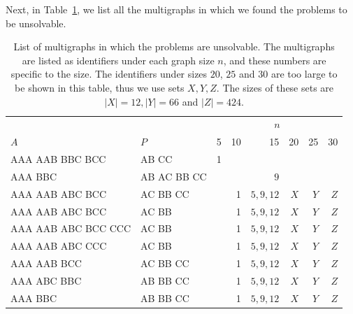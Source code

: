 Next, in Table~\ref{tbl:results:asd3}, we list all the multigraphs in which we found the problems to be unsolvable.

\begin{table}[H]
    \centering
    \begin{tabular}{ll|r|r|r|r|r|r}
        \toprule
        && \multicolumn{6}{c}{$n$} \\
        \cmidrule{3-8}
        $A$ & $P$ & 5&10&15&20&25&30\\
        \midrule
        AAA AAB BBC BCC     & AB CC       & 1 &   &          &     &     &    \\
        AAA BBC             & AB AC BB CC &   &   & $9$      &     &     &    \\
        AAA AAB ABC BCC     & AC BB CC    &   & 1 & $5,9,12$ & $X$ & $Y$ & $Z$\\
        AAA AAB ABC BCC     & AC BB       &   & 1 & $5,9,12$ & $X$ & $Y$ & $Z$\\
        AAA AAB ABC BCC CCC & AC BB       &   & 1 & $5,9,12$ & $X$ & $Y$ & $Z$\\
        AAA AAB ABC CCC     & AC BB       &   & 1 & $5,9,12$ & $X$ & $Y$ & $Z$\\
        AAA AAB BCC         & AC BB CC    &   & 1 & $5,9,12$ & $X$ & $Y$ & $Z$\\
        AAA ABC BBC         & AB BB CC    &   & 1 & $5,9,12$ & $X$ & $Y$ & $Z$\\
        AAA BBC             & AB BB CC    &   & 1 & $5,9,12$ & $X$ & $Y$ & $Z$\\
        \bottomrule
    \end{tabular}
    \caption{%
    List of multigraphs in which the problems are unsolvable.
    The multigraphs are listed as identifiers under each graph size $n$, and these numbers are specific to the size.
    The identifiers under sizes $20$, $25$ and $30$ are too large to be shown in this table, thus we use sets $X,Y,Z$.
    The sizes of these sets are $|X|=12, |Y|=66$ and $|Z|=424$.
    }
    \label{tbl:results:asd3}
\end{table}

